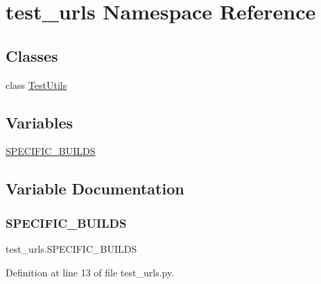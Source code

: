 \hypertarget{namespacetest__urls}{}\section{test\+\_\+urls Namespace Reference}
\label{namespacetest__urls}
\subsection*{Classes}
\begin{DoxyCompactItemize}
\item 
class \hyperlink{classtest__urls_1_1TestUtils}{Test\+Utils}
\end{DoxyCompactItemize}
\subsection*{Variables}
\begin{DoxyCompactItemize}
\item 
\hyperlink{namespacetest__urls_abe95b4834bb569ebf20615fe8f3ba035}{S\+P\+E\+C\+I\+F\+I\+C\+\_\+\+B\+U\+I\+L\+DS}
\end{DoxyCompactItemize}


\subsection{Variable Documentation}
\mbox{\label{namespacetest__urls_abe95b4834bb569ebf20615fe8f3ba035}} 
\subsubsection{\texorpdfstring{S\+P\+E\+C\+I\+F\+I\+C\+\_\+\+B\+U\+I\+L\+DS}{SPECIFIC\_BUILDS}}
{\footnotesize\ttfamily test\+\_\+urls.\+S\+P\+E\+C\+I\+F\+I\+C\+\_\+\+B\+U\+I\+L\+DS}



Definition at line 13 of file test\+\_\+urls.\+py.

